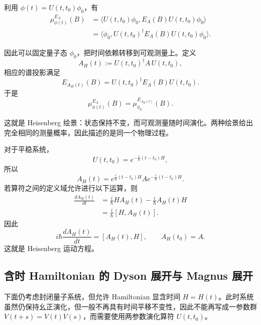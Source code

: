\documentclass[UTF8,a4paper,11pt,openany]{ctexbook}
\begin{document}
利用 $\phi(t)=U(t,t_0)\phi_0$，有
\begin{align}
    \mu_{\phi(t)}^{E_A}(B)
    &=
    \langle
        U(t,t_0)\phi_0,
        E_A(B)U(t,t_0)\phi_0
    \rangle
    \nonumber\\
    &=
    \langle
        \phi_0,
        U(t,t_0)^\dagger
        E_A(B)
        U(t,t_0)\phi_0
    \rangle.
\end{align}

因此可以固定量子态 $\phi_0$，把时间依赖转移到可观测量上。定义
\begin{equation}
    A_H(t)
    :=
    U(t,t_0)^\dagger A\,U(t,t_0),
\end{equation}
相应的谱投影满足
\begin{equation}
    E_{A_H(t)}(B)
    =
    U(t,t_0)^\dagger E_A(B)U(t,t_0).
\end{equation}
于是
\begin{equation}
    \mu_{\phi(t)}^{E_A}(B)
    =
    \mu_{\phi_0}^{E_{A_H(t)}}(B).
\end{equation}

这就是 Heisenberg 绘景：状态保持不变，而可观测量随时间演化。两种绘景给出完全相同的测量概率，因此描述的是同一个物理过程。

对于平稳系统，
\[
U(t,t_0)
=
e^{-\frac{i}{\hbar}(t-t_0)H},
\]
所以
\begin{equation}
    A_H(t)
    =
    e^{\frac{i}{\hbar}(t-t_0)H}
    A
    e^{-\frac{i}{\hbar}(t-t_0)H}.
\end{equation}
若算符之间的定义域允许进行以下运算，则
\begin{align}
    \frac{dA_H(t)}{dt}
    &=
    \frac{i}{\hbar}HA_H(t)
    -
    \frac{i}{\hbar}A_H(t)H
    \nonumber\\
    &=
    \frac{i}{\hbar}[H,A_H(t)].
\end{align}
因此
\begin{equation}
    i\hbar\frac{dA_H(t)}{dt}
    =
    [A_H(t),H],
    \qquad
    A_H(t_0)=A.
\end{equation}
这就是 Heisenberg 运动方程。

\subsection{含时 Hamiltonian 的 Dyson 展开与 Magnus 展开}

下面仍考虑封闭量子系统，但允许 Hamiltonian 显含时间
$H=H(t)$。此时系统虽然仍保持幺正演化，但一般不再具有时间平移不变性，因此不能再写成一参数群
$V(t+s)=V(t)V(s)$，而需要使用两参数演化算符
$U(t,t_0)$。
\end{document}
